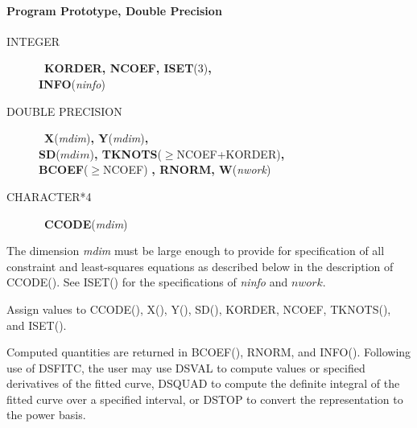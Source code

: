 \documentclass[twoside]{MATH77}
\begin{document}
\paragraph{Program Prototype, Double Precision}
\begin{description}
\item[INTEGER]  \ {\bf KORDER, NCOEF, ISET}(3){\bf ,\\ INFO}({\em ninfo})

\item[DOUBLE PRECISION]  \ {\bf X}({\em mdim}){\bf , Y}({\em mdim}){\bf ,\\ SD}($%
mdim $){\bf , TKNOTS}($\geq $NCOEF+KORDER){\bf ,\\ BCOEF}($\geq $NCOEF){\bf %
, RNORM, W}({\em nwork})

\item[CHARACTER*4]  \ {\bf CCODE}({\em mdim})
\end{description}
The dimension {\em mdim} must be large enough to provide for specification of
all constraint and least-squares equations as described below in the
description of CCODE(). See ISET() for the specifications of {\em ninfo} and $%
nwork $.

Assign values to CCODE(), X(), Y(), SD(), KORDER, NCOEF, TKNOTS(), and
ISET().
\begin{center}
\end{center}
Computed quantities are returned in BCOEF(), RNORM, and INFO(). Following
use of DSFITC, the user may use DSVAL to compute values or specified
derivatives of the fitted curve, DSQUAD to compute the definite integral of
the fitted curve over a specified interval, or DSTOP to convert the
representation to the power basis.
\end{document}
